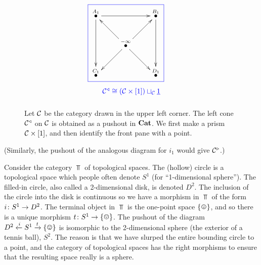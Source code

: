 \begin{example}
\begin{figure}[H]
$$\parbox{1.7in}{\cfbox{blue}{\parbox{1.7in}{
\xymatrix{
\LMO{A_1}\ar[rr]\ar[dd]&&\LMO{B_1}\ar[dd]\\
&\LMO{-\infty}\ar[ur]\ar[dr]\ar[ul]\ar[dl]\\
\LMO{C_1}&&\LMO{D_1}}}}\begin{center}\color{blue}{$\mcC\lcone\iso(\mcC\times[1])\sqcup_{\mcC}\ul{1}$}\end{center}}
$$
\caption{Let $\mathcal{C}$ be the category drawn in the upper left corner. The left cone $\mathcal{C}^\triangleleft$ on $\mathcal{C}$ is obtained as a pushout in ${\bf Cat}$. We first make a prism $\mathcal{C}\times[1]$, and then identify the front pane with a point.}
\label{fig:left cone}
\end{figure}
(Similarly, the pushout of the analogous diagram for $i_1$ would give $\mathcal{C}^\triangleright$.)

\end{example}

\begin{example}\label{ex:pushout in Top}

Consider the category $\Top$ of topological spaces. The (hollow) circle is a topological space which people often denote $S^1$ (for “1-dimensional sphere”). The filled-in circle, also called a 2-dimensional disk, is denoted $D^2$. The inclusion of the circle into the disk is continuous so we have a morphism in $\Top$ of the form $i\colon S^1\rightarrow D^2$. The terminal object in $\Top$ is the one-point space $\singleton$, and so there is a unique morphism $t\taking S^1\to\singleton$. The pushout of the diagram $D^2\From{i}S^1\To{t}\singleton$ is isomorphic to the 2-dimensional sphere (the exterior of a tennis ball), $S^2$. The reason is that we have slurped the entire bounding circle to a point, and the category of topological spaces has the right morphisms to ensure that the resulting space really is a sphere. 

\end{example}

